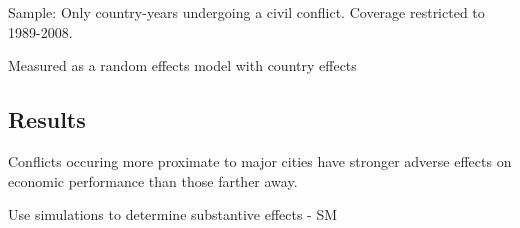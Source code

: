 Sample: Only country-years undergoing a civil conflict. Coverage restricted to 1989-2008. 

Measured as a random effects model with country effects 

\subsection{Results} 

Conflicts occuring more proximate to major cities have stronger adverse effects on economic performance than those farther away. 

\begin{figure}[ht]
	\centering
	\resizebox{.6\textwidth}{!}{}
\end{figure}
\FloatBarrier

Use simulations to determine substantive effects - SM

\begin{figure}[ht]
	\centering
	\resizebox{.8\textwidth}{!}{}
\end{figure}
\FloatBarrier